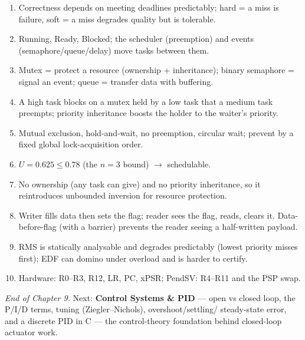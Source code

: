 \begin{answerkey}
\begin{enumerate}
\item Correctness depends on meeting deadlines predictably; hard = a miss is
  failure, soft = a miss degrades quality but is tolerable.
\item Running, Ready, Blocked; the scheduler (preemption) and events
  (semaphore/queue/delay) move tasks between them.
\item Mutex = protect a resource (ownership + inheritance); binary semaphore =
  signal an event; queue = transfer data with buffering.
\item A high task blocks on a mutex held by a low task that a medium task
  preempts; priority inheritance boosts the holder to the waiter's priority.
\item Mutual exclusion, hold-and-wait, no preemption, circular wait; prevent by
  a fixed global lock-acquisition order.
\item $U=0.625 \le 0.78$ (the $n=3$ bound) $\rightarrow$ schedulable.
\item No ownership (any task can give) and no priority inheritance, so it
  reintroduces unbounded inversion for resource protection.
\item Writer fills data then sets the flag; reader sees the flag, reads, clears
  it. Data-before-flag (with a barrier) prevents the reader seeing a
  half-written payload.
\item RMS is statically analysable and degrades predictably (lowest priority
  misses first); EDF can domino under overload and is harder to certify.
\item Hardware: R0--R3, R12, LR, PC, xPSR; PendSV: R4--R11 and the PSP swap.
\end{enumerate}
\end{answerkey}

\begin{partnote}
\emph{End of Chapter 9.} Next: \textbf{Control Systems \& PID} --- open vs
closed loop, the P/I/D terms, tuning (Ziegler--Nichols), overshoot/settling/
steady-state error, and a discrete PID in C --- the control-theory foundation
behind closed-loop actuator work.
\end{partnote}
